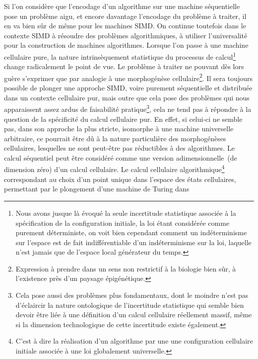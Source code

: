 Si l'on consid\`ere que l'encodage d'un algorithme sur une machine
s\'equentielle pose un probl\`eme aigu, et encore davantage
l'encodage du probl\`eme \`a traiter, il en va bien s\^ur de m\^eme pour les
machines SIMD. %
On continue toutefois dans le contexte SIMD \`a r\'esoudre des probl\`emes
algorithmiques, \`a utiliser l'universalit\'e pour la construction de
machines algorithmes. %
Lorsque l'on passe \`a une machine cellulaire pure, la nature
intrins\`equement statistique du processus de calcul\footnote{%
  Nous avons jusque l\`a \'evoqu\'e la seule incertitude statistique
  associ\'ee \`a la sp\'ecification de la configuration initiale, la loi
  \'etant consid\'er\'ee comme purement d\'eterministe, on voit bien cependant
  comment un ind\'eterminisme sur l'espace est de fait indiff\'erentiable
  d'un ind\'eterminisme sur la loi, laquelle n'est jamais que de
  l'espace local g\'en\'erateur du temps.} %
change radicalement le point de vue. %
Le probl\`eme \`a traiter ne pouvant d\`es lors gu\`ere s'exprimer que par
analogie \`a une morphog\'en\`ese
cellulaire\footnote{%
  Expression \`a prendre dans un sens non restrictif \`a la biologie bien
  s\^ur, \`a l'existence pr\`es d'un paysage \'epig\'en\'etique.}. %
Il sera toujours possible de plonger une approche SIMD, voire
purement s\'equentielle et distribu\'ee dans un contexte cellulaire pur,
mais outre que cela pose des probl\`emes qui nous apparaissent assez
ardus de faisabilit\'e pratique\footnote{%
  Cela pose aussi des probl\`emes plus fondamentaux, dont le moindre
  n'est pas d'\'eclaircir la nature ontologique de l'incertitude
  statistique qui semble bien devoir \^etre li\'ee \`a une d\'efinition d'un
  calcul cellulaire r\'eellement massif, m\^eme si la dimension
  technologique de cette incertitude existe \'egalement.}, %
cela ne tend pas \`a r\'epondre \`a la
question de la sp\'ecificit\'e du calcul cellulaire pur. %
En effet, si celui-ci ne semble pas, dans son approche la plus stricte,
isomorphe \`a une machine universelle arbitraire, ce pourrait \^etre d\^u \`a
la nature particuli\`ere des morphog\'en\`eses cellulaires, lesquelles ne
sont peut-\^etre pas r\'eductibles \`a des algorithmes. %
Le calcul s\'equentiel peut \^etre consid\'er\'e comme une version
adimensionnelle~(de dimension z\'ero) d'un calcul cellulaire. %
Le calcul cellulaire algorithmique\footnote{%
  C'est \`a dire la r\'ealisation d'un algorithme par une une
  configuration cellulaire initiale associ\'ee \`a une loi globalement
  universelle.} %
correspondant au choix d'un point unique dans l'espace des \'etats
cellulaires, permettant par le plongement d'une machine de Turing dans
